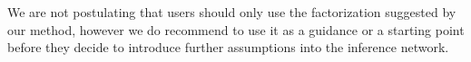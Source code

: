 \documentclass[12pt]{article}
\begin{document}
We are not postulating that users should only use the factorization suggested by our method,
however we do recommend to use it as a guidance or a starting point before they decide to
introduce further assumptions into the inference network.



\end{document}
